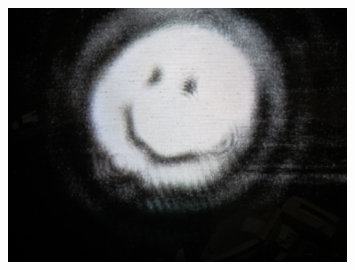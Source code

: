 \begin{figure}
\begin{centering}
\includegraphics[width=0.8\textwidth]{figures/PMCRefl_smiley.JPG}
\label{fig:smiley}
\end{centering}
\end{figure}


\the\columnwidth